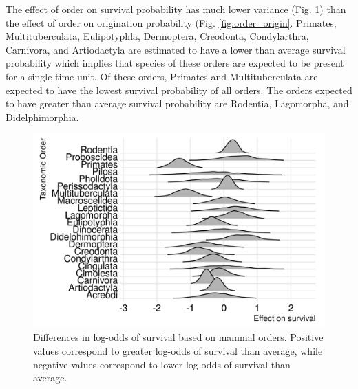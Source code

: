 \documentclass[12pt,letterpaper]{article}
\begin{document}
The effect of order on survival probability has much lower variance (Fig. \ref{fig:order_surv}) than the effect of order on origination probability (Fig. \ref{fig:order_origin}. Primates, Multituberculata, Eulipotyphla, Dermoptera, Creodonta, Condylarthra, Carnivora, and Artiodactyla are estimated to have a lower than average survival probability which implies that species of these orders are expected to be present for a single time unit. Of these orders, Primates and Multituberculata are expected to have the lowest survival probability of all orders. The orders expected to have greater than average survival probability are Rodentia, Lagomorpha, and Didelphimorphia.
\begin{figure}[ht]
  \centering
  \includegraphics[width=\textwidth,height=0.4\textheight,keepaspectratio=true]{figure/order_survival_bd}
  \caption{Differences in log-odds of survival based on mammal orders. Positive values correspond to greater log-odds of survival than average, while negative values correspond to lower log-odds of survival than average.}
  \label{fig:order_surv}
\end{figure}
\end{document}
